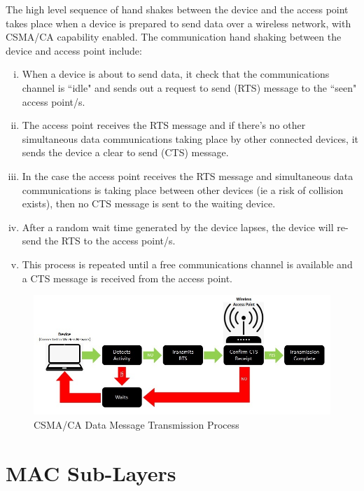 The high level sequence of hand shakes between the device and the access
point takes place when a device is  prepared to send data over a wireless
network, with CSMA/CA capability enabled. The communication hand shaking
between the device and access point include:

\begin{enumerate}[(i)]

\item When a device is about to send data, it check that the communications 
channel is ``idle" and sends out a request to send (RTS) message to the ``seen" access point/s.
\item The access point receives the RTS message and if there's no other 
simultaneous data communications taking place by other connected devices, 
it sends the device a clear to send (CTS) message.
\item In the case the access point receives the RTS message and simultaneous 
data communications is taking place between other devices (ie a risk of collision 
exists), then no CTS message is sent to the waiting device.
\item After a random wait time generated by the device lapses, the 
device will re-send the RTS to the access point/s.
\item This process is repeated until a free communications channel is 
available and a CTS message is received from the access point.

\end{enumerate}

\begin{figure}
\centering
	\includegraphics[width=12cm]{CSMA_CA.jpg}
	\caption{CSMA/CA Data Message Transmission Process}
	\label{CSMA_CA}
\end{figure}



\section{MAC Sub-Layers}

